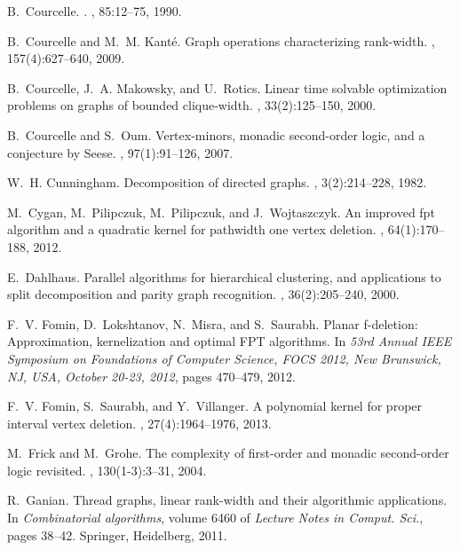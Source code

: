 \documentclass[11pt]{article}
\theoremstyle{remark}
\begin{document}
\begin{thebibliography}{10}
B.~Courcelle.
.
, 85:12--75, 1990.

B.~Courcelle and M.~M. Kant{\'{e}}.
\newblock Graph operations characterizing rank-width.
, 157(4):627--640, 2009.

B.~Courcelle, J.~A. Makowsky, and U.~Rotics.
\newblock Linear time solvable optimization problems on graphs of bounded
  clique-width.
, 33(2):125--150, 2000.

B.~Courcelle and S.~Oum.
\newblock Vertex-minors, monadic second-order logic, and a conjecture by
  {S}eese.
, 97(1):91--126, 2007.

W.~H. Cunningham.
\newblock Decomposition of directed graphs.
, 3(2):214--228, 1982.

M.~Cygan, M.~Pilipczuk, M.~Pilipczuk, and J.~Wojtaszczyk.
\newblock An improved fpt algorithm and a quadratic kernel for pathwidth one
  vertex deletion.
, 64(1):170--188, 2012.

E.~Dahlhaus.
\newblock Parallel algorithms for hierarchical clustering, and applications to
  split decomposition and parity graph recognition.
, 36(2):205--240, 2000.

F.~V. Fomin, D.~Lokshtanov, N.~Misra, and S.~Saurabh.
\newblock Planar f-deletion: Approximation, kernelization and optimal {FPT}
  algorithms.
\newblock In {\em 53rd Annual {IEEE} Symposium on Foundations of Computer
  Science, {FOCS} 2012, New Brunswick, NJ, USA, October 20-23, 2012}, pages
  470--479, 2012.

F.~V. Fomin, S.~Saurabh, and Y.~Villanger.
\newblock A polynomial kernel for proper interval vertex deletion.
, 27(4):1964--1976, 2013.

M.~Frick and M.~Grohe.
\newblock The complexity of first-order and monadic second-order logic
  revisited.
, 130(1-3):3--31, 2004.

R.~Ganian.
\newblock Thread graphs, linear rank-width and their algorithmic applications.
\newblock In {\em Combinatorial algorithms}, volume 6460 of {\em Lecture Notes
  in Comput. Sci.}, pages 38--42. Springer, Heidelberg, 2011.


\end{thebibliography}
\end{document}
